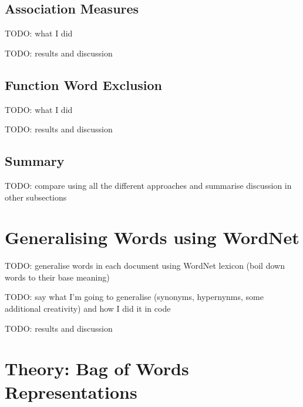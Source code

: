 \documentclass{article}
\begin{document}
\subsection{Association Measures}

TODO: what I did

TODO: results and discussion

\subsection{Function Word Exclusion}

TODO: what I did

TODO: results and discussion

\subsection{Summary}

TODO: compare using all the different approaches and summarise discussion in other subsections

\section{Generalising Words using WordNet}

TODO: generalise words in each document using WordNet lexicon (boil down words to their base meaning)

TODO: say what I'm going to generalise (synonyms, hypernynms, some additional creativity) and how I did it in code

TODO: results and discussion

\section{Theory: Bag of Words Representations}
\end{document}
